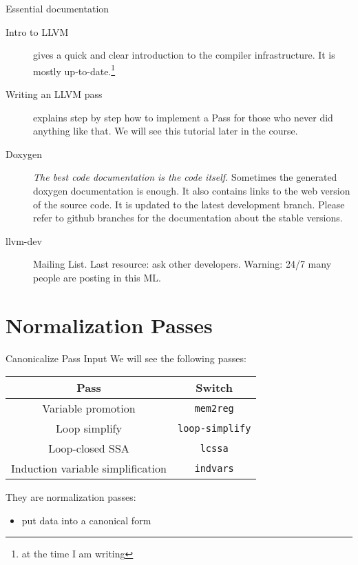 \documentclass[10pt,mathserif]{beamer}
\begin{document}
\begin{frame}[t]{Essential documentation}
  \begin{description}
    \item[Intro to LLVM] \cite{LOCAL:www/llvmIntro}
          gives a quick and clear introduction to the compiler infrastructure.
          It is mostly up-to-date.\footnote{at the time I am writing}
    \vfill
    \item[Writing an LLVM pass] \cite{LOCAL:www/llvmWritingAPass}
          explains step by step how to implement a Pass
          for those who never did anything like that.
          We will see this tutorial later in the course.
    \vfill
    \item[Doxygen] \cite{LOCAL:www/llvmDoxygen}
          \textit{The best code documentation is the code itself.}
          Sometimes the generated doxygen documentation is enough.
          It also contains links to the web version of the source code.
          It is updated to the latest development branch.
          Please refer to github branches for the documentation about the stable versions.
    \vfill
    \item[llvm-dev] Mailing List. Last resource: ask other developers.
          Warning: 24/7 many people are posting in this ML.
  \end{description}
\end{frame}

\section{Normalization Passes}
\begin{frame}{Canonicalize Pass Input}
We will see the following passes:

\begin{table}
\centering
\begin{tabular}{cc}
\toprule

\multicolumn{1}{c}{\textbf{Pass}}    &
\multicolumn{1}{c}{\textbf{Switch}} \\

\midrule

Variable promotion  &
\texttt{mem2reg}   \\

Loop simplify           &
\texttt{loop-simplify} \\

Loop-closed SSA  &
\texttt{lcssa}  \\

Induction variable simplification  &
\texttt{indvars}                  \\

\bottomrule
\end{tabular}
\end{table}

They are \alert{normalization} passes:

\begin{itemize}
\item put data into a canonical form
\end{itemize}
\end{frame}
\end{document}
